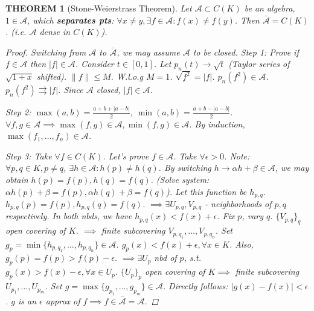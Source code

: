 \documentclass[12pt]{article}
\theoremstyle{blueplain}
\newtheorem{theorem}{THEOREM}[section]
\theoremstyle{bluedef}
\theoremstyle{blueremark}
\numberwithin{equation}{section}
\begin{document}
      \begin{theorem}[Stone-Weierstrass Theorem]
        Let $\mathcal{A} \subset C(K)$ be an algebra, $1 \in \mathcal{A}$, which \textbf{separates pts}: $\forall x \neq y, \exists f \in \mathcal{A}: f(x) \neq f(y)$.
        Then $\bar{\mathcal{A}} = C(K)$. (i.e. $\mathcal{A}$ dense in $C(K)$).
        \begin{proof}
          Switching from $\mathcal{A}$ to $\bar{\mathcal{A}}$, we may assume $\mathcal{A}$ to be closed.
          Step 1: Prove if $f \in \mathcal{A}$ then $|f| \in \mathcal{A}$.
          Consider $t \in [0, 1]$. Let $p_n(t) \to \sqrt{t}$ (Taylor series of $\sqrt{1+x}$ shifted).
          $\|f\| \le M$. W.l.o.g $M=1$.
          $\sqrt{f^2} = |f|$. $p_n(f^2) \in \mathcal{A}$. $p_n(f^2) \rightrightarrows |f|$.
          Since $\mathcal{A}$ closed, $|f| \in \mathcal{A}$.

          Step 2: $\max(a,b) = \frac{a+b+|a-b|}{2}$, $\min(a,b) = \frac{a+b-|a-b|}{2}$.
          $\forall f, g \in \mathcal{A} \implies \max(f, g) \in \mathcal{A}, \min(f, g) \in \mathcal{A}$.
          By induction, $\max(f_1, \dots, f_n) \in \mathcal{A}$.

          Step 3: Take $\forall f \in C(K)$. Let's prove $f \in \mathcal{A}$.
          Take $\forall \epsilon > 0$.
          Note: $\forall p, q \in K, p \neq q$, $\exists h \in \mathcal{A}: h(p) \neq h(q)$.
          By switching $h \to \alpha h + \beta \in \mathcal{A}$, we may obtain $h(p) = f(p), h(q) = f(q)$.
          (Solve system: $\alpha h(p) + \beta = f(p), \alpha h(q) + \beta = f(q)$).
          Let this function be $h_{p,q}$.
          $h_{p,q}(p) = f(p), h_{p,q}(q) = f(q)$.
          $\implies \exists U_{p,q}, V_{p,q}$ - neighborhoods of $p, q$ respectively.
          In both nbds, we have $h_{p,q}(x) < f(x) + \epsilon$.
          Fix $p$, vary $q$. $\{V_{p,q}\}_q$ open covering of $K$.
          $\implies$ finite subcovering $V_{p, q_1}, \ldots, V_{p, q_n}$.
          Set $g_p = \min \{h_{p, q_1}, \ldots, h_{p, q_n}\} \in \mathcal{A}$.
          $g_p(x) < f(x) + \epsilon, \forall x \in K$.
          Also, $g_p(p) = f(p) > f(p) - \epsilon$.
          $\implies \exists U_p$ nbd of $p$, s.t. $g_p(x) > f(x) - \epsilon, \forall x \in U_p$.
          $\{U_p\}_p$ open covering of $K \implies$ finite subcovering $U_{p_1}, \ldots, U_{p_m}$.
          Set $g = \max \{g_{p_1}, \ldots, g_{p_m}\} \in \mathcal{A}$.
          Directly follows: $|g(x) - f(x)| < \epsilon$.
          $g$ is an $\epsilon$ approx of $f \implies f \in \bar{\mathcal{A}} = \mathcal{A}$.
        \end{proof}
      \end{theorem}
\end{document}
